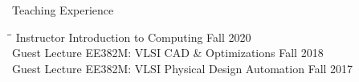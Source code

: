 \begin{rSection}{Teaching Experience}

\begin{tabbing}
\hspace{3.3in}\= \hspace{3.1in}\= \kill
Instructor \> Introduction to Computing \> Fall 2020 \\
Guest Lecture \> EE382M: VLSI CAD \& Optimizations \> Fall 2018 \\
Guest Lecture \> EE382M: VLSI Physical Design Automation \> Fall 2017 
\end{tabbing}

\end{rSection}
